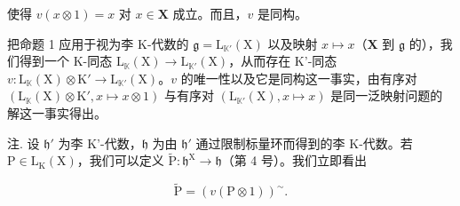 使得 \(v(x \otimes 1) = x\) 对 \(x \in \mathbf{X}\) 成立。而且，\(v\) 是同构。

把命题 1 应用于视为李 K-代数的 \(\mathfrak{g} = \mathrm{L}_{\mathbb{K}'}(\mathrm{X})\) 以及映射 \(x\mapsto x\)（\(\mathbf{X}\) 到 \(\mathfrak{g}\) 的），我们得到一个 K-同态 \(\mathrm{L}_{\mathbb{K}}(\mathrm{X})\to \mathrm{L}_{\mathbb{K}'}(\mathrm{X})\)，从而存在 K'-同态 \(v\colon \mathrm{L}_{\mathbb{K}}(\mathrm{X})\otimes \mathrm{K}'\to \mathrm{L}_{\mathbb{K}'}(\mathrm{X})\)。\(v\) 的唯一性以及它是同构这一事实，由有序对 \((\mathrm{L}_{\mathbb{K}}(\mathrm{X})\otimes \mathrm{K}',x\mapsto x\otimes 1)\) 与有序对 \((\mathrm{L}_{\mathbb{K}'}(\mathrm{X}),x\mapsto x)\) 是同一泛映射问题的解这一事实得出。

注. 设 \(\mathfrak{h}'\) 为李 K'-代数，\(\mathfrak{h}\) 为由 \(\mathfrak{h}'\) 通过限制标量环而得到的李 K-代数。若 \(\mathrm{P} \in \mathrm{L}_{\mathrm{K}}(\mathrm{X})\)，我们可以定义 \(\tilde{\mathrm{P}}: \mathfrak{h}^{\mathrm{X}} \to \mathfrak{h}\)（第 4 号）。我们立即看出

\[
\tilde {\mathrm{P}} = (v (\mathrm{P} \otimes 1)) ^ {\sim}.
\]
